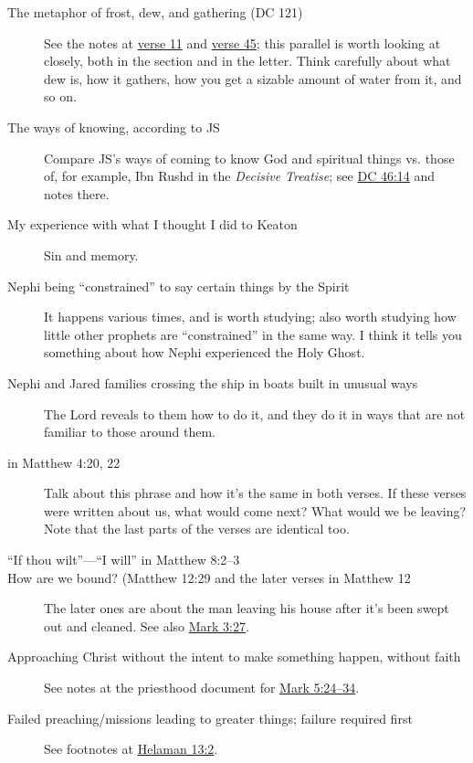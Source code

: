 \begin{description}
		\item[The metaphor of frost, dew, and gathering (DC 121)]
			See the notes at \hyperref[DC121-11]{verse 11} and \hyperref[DC121-45]{verse 45}; this parallel is worth looking at closely, both in the section and in the letter. Think carefully about what dew is, how it gathers, how you get a sizable amount of water from it, and so on.
			
		\item[The ways of knowing, according to JS]
			Compare JS's ways of coming to know God and spiritual things vs. those of, for example, Ibn Rushd in the \textit{Decisive Treatise}; see \hyperref[DC46-14]{DC 46:14} and notes there.
			
		\item[My experience with what I thought I did to Keaton]
			Sin and memory.
			
		\item[Nephi being ``constrained'' to say certain things by the Spirit]
			It happens various times, and is worth studying; also worth studying how little other prophets are ``constrained'' in the same way. I think it tells you something about how Nephi experienced the Holy Ghost.
			
		\item[Nephi and Jared families crossing the ship in boats built in unusual ways]
			The Lord reveals to them how to do it, and they do it in ways that are not familiar to those around them.
			
		\item[ in Matthew 4:20, 22]
			Talk about this phrase and how it's the same in both verses. If these verses were written about us, what would come next? What would we be leaving? Note that the last parts of the verses are identical too.
			
		\item[``If thou wilt''---``I will'' in Matthew 8:2--3]
		
		\item[How are we bound? (Matthew 12:29 and the later verses in Matthew 12]
			The later ones are about the man leaving his house after it's been swept out and cleaned. See also \hyperref[MARK-3-27]{Mark 3:27}.
			
		\item[Approaching Christ without the intent to make something happen, without faith]
			See notes at the priesthood document for \hyperref[MARK-5-24]{Mark 5:24--34}.
			
		\item[Failed preaching/missions leading to greater things; failure required first]
			See footnotes at \hyperref[HELAMAN-13-2]{Helaman 13:2}.
			

\end{description}
